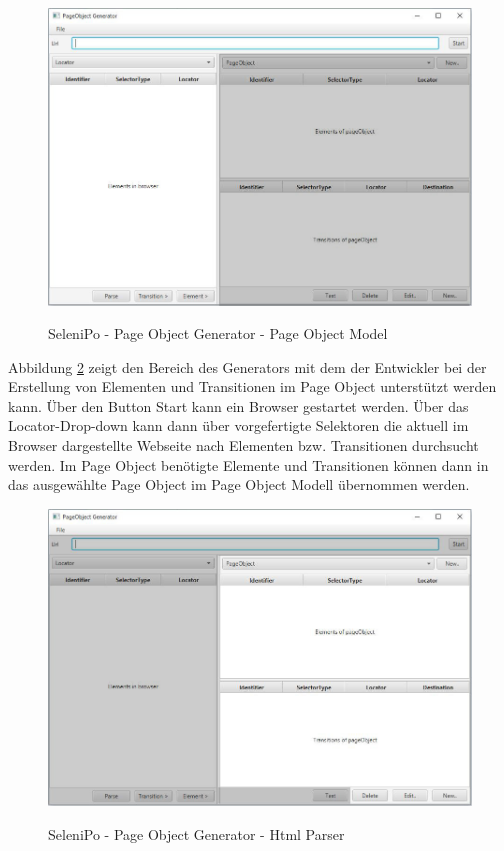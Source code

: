 \begin{figure}[htb]
  \centering  
  \includegraphics[scale=0.5]{img/poGeneratorPo.JPG}\\
  \caption{SeleniPo - Page Object Generator - Page Object Model}
  \label{fig:poGeneratorPo}
\end{figure}

\newpage

Abbildung \ref{fig:poGeneratorHtml} zeigt den Bereich des Generators mit dem der Entwickler bei der Erstellung von Elementen und Transitionen im Page Object unterstützt werden kann.
Über den Button Start kann ein Browser gestartet werden. Über das Locator-Drop-down kann dann über vorgefertigte Selektoren die aktuell im Browser dargestellte Webseite nach Elementen bzw. Transitionen durchsucht werden. Im Page Object benötigte Elemente und Transitionen können dann in das ausgewählte Page Object im Page Object Modell übernommen werden.

\begin{figure}[htb]
  \centering  
  \includegraphics[scale=0.5]{img/poGeneratorHtml.JPG}\\
  \caption{SeleniPo - Page Object Generator - Html Parser}
  \label{fig:poGeneratorHtml}
\end{figure}

